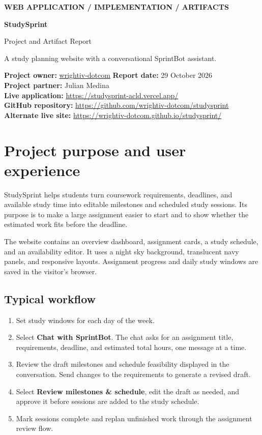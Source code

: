 \documentclass[11pt,letterpaper]{article}
\begin{document}
{\color{blue}\small\bfseries WEB APPLICATION / IMPLEMENTATION / ARTIFACTS}\par
{\Huge\bfseries\color{navy}StudySprint}\par
{\Large Project and Artifact Report}\par
{\color{gray}A study planning website with a conversational SprintBot assistant.}

\colorbox{pale}{\parbox{\dimexpr\linewidth-2\fboxsep}{\textbf{Project owner:} \href{https://github.com/wrightiv-dotcom}{wrightiv-dotcom}\quad
\textbf{Report date:} 29 October 2026\\[4pt]
\textbf{Project partner:} Julian Medina\\[4pt]
\textbf{Live application:} \url{https://studysprint-acld.vercel.app/}\\
\textbf{GitHub repository:} \url{https://github.com/wrightiv-dotcom/studysprint}\\
\textbf{Alternate live site:} \url{https://wrightiv-dotcom.github.io/studysprint/}}}

\section{Project purpose and user experience}
StudySprint helps students turn coursework requirements, deadlines, and available study time into editable milestones and scheduled study sessions. Its purpose is to make a large assignment easier to start and to show whether the estimated work fits before the deadline.

The website contains an overview dashboard, assignment cards, a study schedule, and an availability editor. It uses a night sky background, translucent navy panels, and responsive layouts. Assignment progress and daily study windows are saved in the visitor's browser.

\subsection{Typical workflow}
\begin{enumerate}
\item Set study windows for each day of the week.
\item Select \textbf{Chat with SprintBot}. The chat asks for an assignment title, requirements, deadline, and estimated total hours, one message at a time.
\item Review the draft milestones and schedule feasibility displayed in the conversation. Send changes to the requirements to generate a revised draft.
\item Select \textbf{Review milestones \& schedule}, edit the draft as needed, and approve it before sessions are added to the study schedule.
\item Mark sessions complete and replan unfinished work through the assignment review flow.
\end{enumerate}
\end{document}
